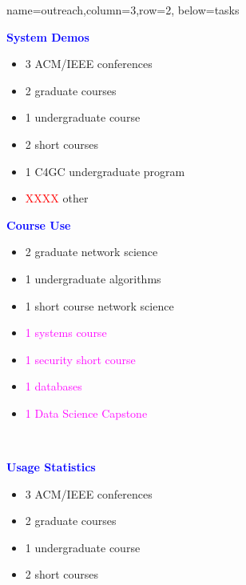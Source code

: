\documentclass[landscape,paperwidth=70in,paperheight=46in,fontscale=0.225]{baposter} %
\begin{document}
\begin{poster}
          {name=outreach,column=3,row=2, below=tasks}{
\begin{minipage}[t]{0.48 \textwidth}
\textcolor{blue}{\textbf{System Demos}}
\medskip
\begin{itemize}[leftmargin=*,noitemsep,topsep=0pt]
    \item 3 ACM/IEEE conferences  \smallskip
    \item 2 graduate courses   \smallskip 
    \item 1 undergraduate course  \smallskip
    \item 2 short courses  \smallskip
    \item 1 C4GC undergraduate program  \smallskip
    \item \textcolor{red}{XXXX} other 
\end{itemize}
\end{minipage}
\quad
\begin{minipage}[t]{0.48 \textwidth}
\textcolor{blue}{\textbf{Course Use}}\
  \medskip
\begin{itemize}[leftmargin=*,noitemsep,topsep=0pt]
    \item 2 graduate network science    \smallskip
    \item 1 undergraduate algorithms   \smallskip
    \item 1 short course network science   \smallskip
    \item \textcolor{magenta}{1 systems course}  \smallskip
    \item \textcolor{magenta}{1 security short course}  \smallskip
    \item \textcolor{magenta}{1 databases}  \smallskip
    \item \textcolor{magenta}{1 Data Science Capstone}
\end{itemize}
\end{minipage}\\
\quad
%
\begin{minipage}[t]{0.48 \textwidth}
\textcolor{blue}{\textbf{Usage Statistics}}
\medskip
\begin{itemize}[leftmargin=*,noitemsep,topsep=0pt]
    \item 3 ACM/IEEE conferences  \smallskip
    \item 2 graduate courses   \smallskip 
    \item 1 undergraduate course  \smallskip
    \item 2 short courses  \smallskip

\end{itemize}
\end{minipage}}
\end{poster}
\end{document}
